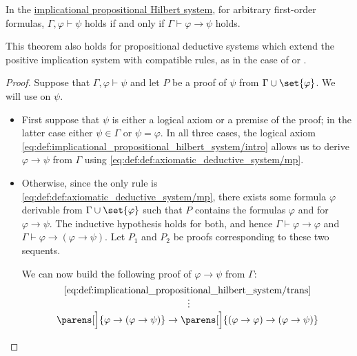 \begin{theorem}\label{thm:syntactic_deduction_theorem}
  In the \hyperref[def:implicational_propositional_hilbert_system]{implicational propositional Hilbert system}, for arbitrary first-order formulas, \( \Gamma, \varphi \vdash \psi \) holds if and only if \( \Gamma \vdash \varphi \rightarrow \psi \) holds.
\end{theorem}
\begin{comments}
  \item This theorem also holds for propositional deductive systems which extend the positive implication system with compatible rules, as in the case of  or .
\end{comments}
\begin{proof}
  \SufficiencySubProof Suppose that \( \Gamma, \varphi \vdash \psi \) and let \( P \) be a proof of \( \psi \) from \( \Gamma \cup \set{ \varphi } \). We will use  on \( \psi \).

  \begin{itemize}
    \item First suppose that \( \psi \) is either a logical axiom or a premise of the proof; in the latter case either \( \psi \in \Gamma \) or \( \psi = \varphi \). In all three cases, the logical axiom \eqref{eq:def:implicational_propositional_hilbert_system/intro} allows us to derive \( \varphi \rightarrow \psi \) from \( \Gamma \) using \eqref{eq:def:def:axiomatic_deductive_system/mp}.

    \item Otherwise, since the only rule is \eqref{eq:def:def:axiomatic_deductive_system/mp}, there exists some formula \( \varphi \) derivable from \( \Gamma \cup \set{ \varphi } \) such that \( P \) contains the formulas \( \varphi \) and for \( \varphi \rightarrow \psi \). The inductive hypothesis holds for both, and hence \( \Gamma \vdash \varphi \to \varphi \) and \( \Gamma \vdash \varphi \to (\varphi \rightarrow \psi) \). Let \( P_1 \) and \( P_2 \) be proofs corresponding to these two sequents.

    We can now build the following proof of \( \varphi \to \psi \) from \( \Gamma \):
    \begin{equation*}
      \begin{prooftree}
        \hypo{ \eqref{eq:def:implicational_propositional_hilbert_system/trans} }
        \ellipsis
          {}
          {
            \parens[\Big]{ \varphi \rightarrow (\varphi \rightarrow \psi) } \rightarrow \parens[\Big]{ (\varphi \rightarrow \varphi) \rightarrow (\varphi \rightarrow \psi)}
          }


\end{prooftree}
\end{equation*}
\end{itemize}
\end{proof}
